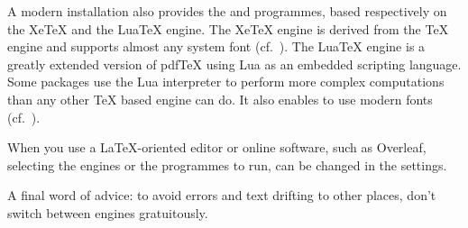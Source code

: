 A modern installation also provides the  and 
programmes, based respectively on the XeTeX and the LuaTeX engine. The XeTeX
engine is derived from the TeX engine and supports almost any system font (cf.\
). The LuaTeX engine is a greatly extended version of pdfTeX
using Lua as an embedded scripting language. Some packages use the Lua
interpreter to perform more complex computations than any other TeX based
engine can do. It also enables \prog{lualatex} to use modern fonts (cf.\
).

When you use a LaTeX-oriented editor or online software, such as Overleaf,
selecting the engines or the programmes to run, can be changed in the settings.

A final word of advice: to avoid errors and text drifting to other places,
don't switch between engines gratuitously.


